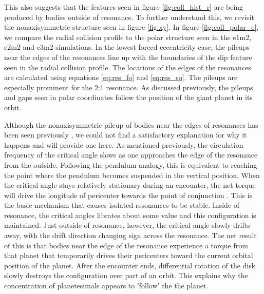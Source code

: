 \documentclass[twocolumn]{aastex63}
\begin{document}
This also suggests that the features seen in figure \ref{fig:coll_hist_r} are being produced by bodies outside of resonance. To further understand this, 
we revisit the nonaxisymmetric structure seen in figure \ref{fig:xy}. In figure \ref{fig:coll_polar_e}, we compare the radial collision profile to the polar 
structure seen in the e1m2, e2m2 and e3m2 simulations. In the lowest forced eccentricity case, the pileups near the edges of the resonances line up 
with the boundaries of the dip feature seen in the radial collision profile. The locations of the edges of the resonances are calculated using equations 
\ref{eq:res_fo} and \ref{eq:res_so}. The pileups are especially prominent for the 2:1 resonance. As discussed previously, the pileups and gaps seen 
in polar coordinates follow the position of the giant planet in its orbit.

Although the nonaxisymmetric pileup of bodies near the edges of resonances has been seen previously 
\citep{2000Icar..143...45R, 2016ApJ...818..159T}, we could not find a satisfactory explanation for why it happens and will provide one here. As 
mentioned previously, the circulation frequency of the critical angle slows as one approaches the edge of the resonance from the outside. Following 
the pendulum analogy, this is equivalent to reaching the point where the pendulum becomes suspended in the vertical position. When the critical 
angle stays relatively stationary during an encounter, the net torque will drive the longitude of pericenter towards the point of conjunction 
\citep{1976ARA&A..14..215P}.  This is the basic mechanism that causes isolated resonances to be stable. Inside of resonance, the critical angles 
librates about some value and this configuration is maintained. Just outside of resonance, however, the critical angle slowly drifts away, with the drift 
direction changing sign across the resonance. The net result of this is that bodies near the edge of the resonance experience a torque from that 
planet that temporarily drives their pericenters toward the current orbital position of the planet. After the encounter ends, differential rotation of the 
disk slowly destroys the configuration over part of an orbit. This explains why the concentration of planetesimals appears to 'follow' the the planet.
\end{document}
